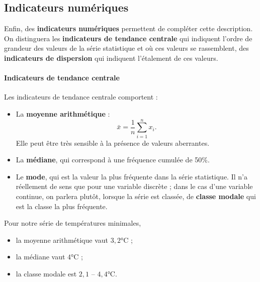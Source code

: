 \subsection{Indicateurs numériques}
Enfin, des \textbf{indicateurs numériques} permettent de compléter cette
description. On distinguera les \textbf{indicateurs de tendance centrale} qui
indiquent l'ordre de grandeur des valeurs de la série statistique et où ces
valeurs se rassemblent, des \textbf{indicateurs de dispersion} qui indiquent
l'étalement de ces valeurs.

\paragraph{Indicateurs de tendance centrale} Les indicateurs de tendance centrale comportent :
\begin{itemize}
	\item La \textbf{moyenne arithmétique} :
	\[\bar x = \frac1n \sum_{i=1}^n x_i.\]
	Elle peut être très sensible à la présence de valeurs aberrantes.
	\item La \textbf{médiane}, qui correspond à une fréquence cumulée de 50\%.
	\item Le \textbf{mode}, qui est la valeur la plus fréquente dans la série
	statistique. Il n'a réellement de sens que pour une variable discrète ;
	dans le cas d'une variable continue, on parlera plutôt, lorsque la série est
	classée, de \textbf{classe modale} qui est la classe la plus fréquente.
\end{itemize}

\begin{exemple}
	Pour notre série de températures minimales,
	\begin{itemize}
		\item la moyenne arithmétique vaut $3,2 \si{\celsius}$ ;
		\item la médiane vaut $4 \si{\celsius}$ ;
		\item la classe modale est $2,1$ -- $4,4 \si{\celsius}$.
	\end{itemize}
\end{exemple}

